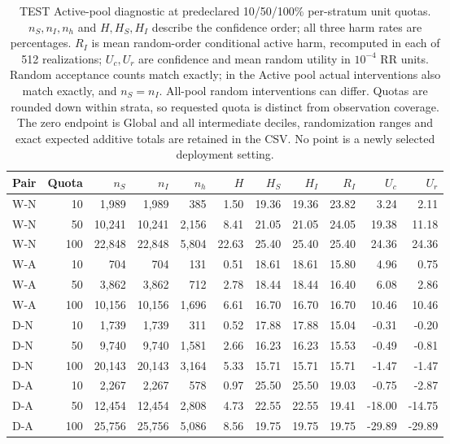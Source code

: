 \begin{table}[htbp]
\centering\footnotesize\setlength{\tabcolsep}{3pt}
\caption{TEST Active-pool diagnostic at predeclared 10/50/100\% per-stratum unit quotas. $n_S,n_I,n_h$ and $H,H_S,H_I$ describe the confidence order; all three harm rates are percentages. $R_I$ is mean random-order conditional active harm, recomputed in each of 512 realizations; $U_c,U_r$ are confidence and mean random utility in $10^{-4}$ RR units. Random acceptance counts match exactly; in the Active pool actual interventions also match exactly, and $n_S=n_I$. All-pool random interventions can differ. Quotas are rounded down within strata, so requested quota is distinct from observation coverage. The zero endpoint is Global and all intermediate deciles, randomization ranges and exact expected additive totals are retained in the CSV. No point is a newly selected deployment setting.}
\label{tab:coverage-counts_active}
\begin{tabular}{lrrrrrrrrrr}
\toprule
Pair & Quota & $n_S$ & $n_I$ & $n_h$ & $H$ & $H_S$ & $H_I$ & $R_I$ & $U_c$ & $U_r$\\
\midrule
W-N & 10 & 1,989 & 1,989 & 385 & 1.50 & 19.36 & 19.36 & 23.82 & 3.24 & 2.11\\
W-N & 50 & 10,241 & 10,241 & 2,156 & 8.41 & 21.05 & 21.05 & 24.05 & 19.38 & 11.18\\
W-N & 100 & 22,848 & 22,848 & 5,804 & 22.63 & 25.40 & 25.40 & 25.40 & 24.36 & 24.36\\
W-A & 10 & 704 & 704 & 131 & 0.51 & 18.61 & 18.61 & 15.80 & 4.96 & 0.75\\
W-A & 50 & 3,862 & 3,862 & 712 & 2.78 & 18.44 & 18.44 & 16.40 & 6.08 & 2.86\\
W-A & 100 & 10,156 & 10,156 & 1,696 & 6.61 & 16.70 & 16.70 & 16.70 & 10.46 & 10.46\\
D-N & 10 & 1,739 & 1,739 & 311 & 0.52 & 17.88 & 17.88 & 15.04 & -0.31 & -0.20\\
D-N & 50 & 9,740 & 9,740 & 1,581 & 2.66 & 16.23 & 16.23 & 15.53 & -0.49 & -0.81\\
D-N & 100 & 20,143 & 20,143 & 3,164 & 5.33 & 15.71 & 15.71 & 15.71 & -1.47 & -1.47\\
D-A & 10 & 2,267 & 2,267 & 578 & 0.97 & 25.50 & 25.50 & 19.03 & -0.75 & -2.87\\
D-A & 50 & 12,454 & 12,454 & 2,808 & 4.73 & 22.55 & 22.55 & 19.41 & -18.00 & -14.75\\
D-A & 100 & 25,756 & 25,756 & 5,086 & 8.56 & 19.75 & 19.75 & 19.75 & -29.89 & -29.89\\

\end{tabular}
\end{table}
